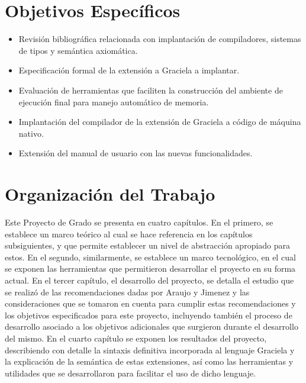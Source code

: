 \section*{Objetivos Específicos}
\begin{itemize}
  \item Revisión bibliográfica relacionada con implantación de compiladores,
  sistemas de tipos y semántica axiomática.

  \item Especificación formal de la extensión a Graciela a implantar.

  \item Evaluación de herramientas que faciliten la construcción del ambiente de
  ejecución final para manejo automático de memoria.

  \item Implantación del compilador de la extensión de Graciela a código de
  máquina nativo.

  \item Extensión del manual de usuario con las nuevas funcionalidades.
\end{itemize}

\section*{Organización del Trabajo}

Este Proyecto de Grado se presenta en cuatro capítulos. En el primero, se
establece un marco teórico al cual se hace referencia en los capítulos
subsiguientes, y que permite establecer un nivel de abstracción apropiado para
estos. En el segundo, similarmente, se establece un marco tecnológico, en el
cual se exponen las herramientas que permitieron desarrollar el proyecto en su
forma actual. En el tercer capítulo, el desarrollo del proyecto, se detalla el
estudio que se realizó de las recomendaciones dadas por Araujo y Jimenez y las
consideraciones que se tomaron en cuenta para cumplir estas recomendaciones y
los objetivos especificados para este proyecto, incluyendo también el proceso de
desarrollo asociado a los objetivos adicionales que surgieron durante el
desarrollo del mismo. En el cuarto capítulo se exponen los resultados del
proyecto, describiendo con detalle la sintaxis definitiva incorporada al
lenguaje Graciela y la explicación de la semántica de estas extensiones, así
como las herramientas y utilidades que se desarrollaron para facilitar el uso de
dicho lenguaje.
